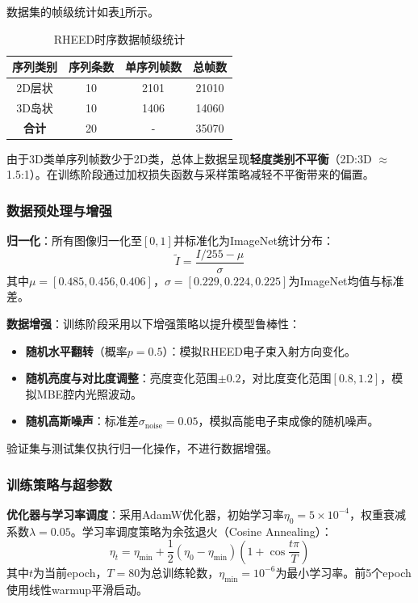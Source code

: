 数据集的帧级统计如表\ref{tab:dataset_stats}所示。
\begin{table}[h]
\centering
\caption{RHEED时序数据帧级统计}
\label{tab:dataset_stats}
\begin{tabular}{cccc}
\hline
\textbf{序列类别} & \textbf{序列条数} & \textbf{单序列帧数} & \textbf{总帧数} \\ \hline
2D层状 & 10 & 2101 & 21010 \\
3D岛状 & 10 & 1406 & 14060 \\ \hline
\textbf{合计} & 20 & - & 35070 \\ \hline
\end{tabular}
\end{table}

由于3D类单序列帧数少于2D类，总体上数据呈现\textbf{轻度类别不平衡}（2D:3D $\approx$ 1.5:1）。在训练阶段通过加权损失函数与采样策略减轻不平衡带来的偏置。

\subsubsection{数据预处理与增强}

\textbf{归一化}：所有图像归一化至$[0,1]$并标准化为ImageNet统计分布：
\begin{equation}
\tilde{I} = \frac{I/255 - \mu}{\sigma}
\end{equation}
其中$\mu = [0.485, 0.456, 0.406]$，$\sigma = [0.229, 0.224, 0.225]$为ImageNet均值与标准差。

\textbf{数据增强}：训练阶段采用以下增强策略以提升模型鲁棒性：
\begin{itemize}
\item \textbf{随机水平翻转}（概率$p=0.5$）：模拟RHEED电子束入射方向变化。
\item \textbf{随机亮度与对比度调整}：亮度变化范围$\pm 0.2$，对比度变化范围$[0.8, 1.2]$，模拟MBE腔内光照波动。
\item \textbf{随机高斯噪声}：标准差$\sigma_{\text{noise}}=0.05$，模拟高能电子束成像的随机噪声。
\end{itemize}

验证集与测试集仅执行归一化操作，不进行数据增强。

\subsubsection{训练策略与超参数}

\textbf{优化器与学习率调度}：采用AdamW优化器，初始学习率$\eta_0 = 5 \times 10^{-4}$，权重衰减系数$\lambda=0.05$。学习率调度策略为余弦退火（Cosine Annealing）：
\begin{equation}
\eta_t = \eta_{\min} + \frac{1}{2}(\eta_0 - \eta_{\min})\left(1 + \cos\frac{t\pi}{T}\right)
\end{equation}
其中$t$为当前epoch，$T=80$为总训练轮数，$\eta_{\min}=10^{-6}$为最小学习率。前5个epoch使用线性warmup平滑启动。

